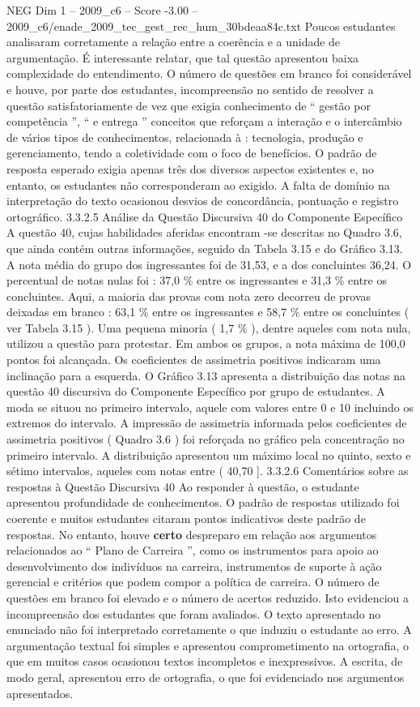 \begin{textsample}{NEG Dim 1 – 2009\_c6 – Score -3.00 – 2009\_c6/enade\_2009\_tec\_gest\_rec\_hum\_30bdeaa84c.txt}
Poucos estudantes analisaram corretamente a relação entre a coerência e a unidade de argumentação.
É interessante relatar, que tal questão apresentou baixa complexidade do entendimento.
O número de questões em branco foi considerável e houve, por parte dos estudantes, incompreensão no sentido de resolver a questão satisfatoriamente de vez que exigia conhecimento de “ gestão por competência ”, “ e entrega ” conceitos que reforçam a interação e o intercâmbio de vários tipos de conhecimentos, relacionada à : tecnologia, produção e gerenciamento, tendo a coletividade com o foco de benefícios.
O padrão de resposta esperado exigia apenas três dos diversos aspectos existentes e, no entanto, os estudantes não corresponderam ao exigido.
A falta de domínio na interpretação do texto ocasionou desvios de concordância, pontuação e registro ortográfico. 3.3.2.5 Análise da Questão Discursiva 40 do Componente Específico A questão 40, cujas habilidades aferidas encontram -se descritas no Quadro 3.6, que ainda contém outras informações, seguido da Tabela 3.15 e do Gráfico 3.13.
A nota média do grupo dos ingressantes foi de 31,53, e a dos concluintes 36,24.
O percentual de notas nulas foi : 37,0 \% entre os ingressantes e 31,3 \% entre os concluintes.
Aqui, a maioria das provas com nota zero decorreu de provas deixadas em branco : 63,1 \% entre os ingressantes e 58,7 \% entre os concluintes ( ver Tabela 3.15 ).
Uma pequena minoria ( 1,7 \% ), dentre aqueles com nota nula, utilizou a questão para protestar.
Em ambos os grupos, a nota máxima de 100,0 pontos foi alcançada.
Os coeficientes de assimetria positivos indicaram uma inclinação para a esquerda.
O Gráfico 3.13 apresenta a distribuição das notas na questão 40 discursiva do Componente Específico por grupo de estudantes.
A moda se situou no primeiro intervalo, aquele com valores entre 0 e 10 incluindo os extremos do intervalo.
A impressão de assimetria informada pelos coeficientes de assimetria positivos ( Quadro 3.6 ) foi reforçada no gráfico pela concentração no primeiro intervalo.
A distribuição apresentou um máximo local no quinto, sexto e sétimo intervalos, aqueles com notas entre ( 40,70 ]. 3.3.2.6 Comentários sobre as respostas à Questão Discursiva 40 Ao responder à questão, o estudante apresentou profundidade de conhecimentos.
O padrão de respostas utilizado foi coerente e muitos estudantes citaram pontos indicativos deste padrão de respostas.
No entanto, houve \textbf{certo} despreparo em relação aos argumentos relacionados ao “ Plano de Carreira ”, como os instrumentos para apoio ao desenvolvimento dos indivíduos na carreira, instrumentos de suporte à ação gerencial e critérios que podem compor a política de carreira.
O número de questões em branco foi elevado e o número de acertos reduzido.
Isto evidenciou a incompreensão dos estudantes que foram avaliados.
O texto apresentado no enunciado não foi interpretado corretamente o que induziu o estudante ao erro.
A argumentação textual foi simples e apresentou comprometimento na ortografia, o que em muitos casos ocasionou textos incompletos e inexpressivos.
A escrita, de modo geral, apresentou erro de ortografia, o que foi evidenciado nos argumentos apresentados.


\end{textsample}
